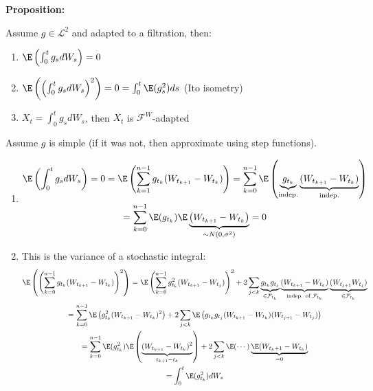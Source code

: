 \noindent\textbf{Proposition:}\par
\noindent Assume $g\in\mathcal{L}^2$ and adapted to a filtration, then:\par
\begin{enumerate}[leftmargin=*]
  \item $\E\left(\int_{0}^{t}g_sdW_s\right) = 0$
  \item $\E\left(\left(\int_{0}^{t}g_sdW_s\right)^2\right) = 0 = \int_{0}^{t}\E(g_s^2)ds$ (Ito isometry)
  \item $X_t = \int_{0}^{t}g_sdW_s$, then $X_t$ is $\mathcal{F}^W$-adapted
\end{enumerate}
\par\bigskip
\begin{prf}[]{}
  Assume $g$ is simple (if it was not, then approximate using step functions).
  \par\bigskip
  \begin{enumerate}[leftmargin=*]
    \item
      \begin{equation*}
        \begin{gathered}
          \E\left(\int_{0}^{t}g_sdW_s\right) = 0 = \E\left(\sum_{k=1}^{n-1}g_{t_k}(W_{t_{k+1}}-W_{t_k})\right) = \sum_{k=0}^{n-1}\E\left(\underbrace{g_{t_k}}_{\text{indep.}}\underbrace{(W_{t_{k+1}}-W_{t_k})}_{\text{indep.}}\right)\\
          = \sum_{k=0}^{n-1}\E(g_{t_k})\E\underbrace{\left(W_{t_{k+1}}-W_{t_k}\right)}_{\sim N(0,\sigma^2)} = 0
        \end{gathered}
      \end{equation*}
      \par\bigskip
    \item This is the variance of a stochastic integral:
      \begin{equation*}
        \begin{gathered}
          \E\left(\left(\sum_{k=0}^{n-1}g_{t_k}(W_{t_{k+1}}-W_{t_k})\right)^2\right) = \E\left(\sum_{k=0}^{n-1}g_{t_k}^2(W_{t_{k+1}}-W_{t_j})\right)^2 + 2\sum_{j<k}\underbrace{g_{t_k}g_{t_j}}_{\in\mathcal{F}_{t_k}}\underbrace{(W_{t_{k+1}}-W_{t_k})}_{\text{indep. of } \mathcal{F}_{t_k}}\underbrace{(W_{t_{j+1}}W_{t_j})}_{\in\mathcal{F}_{t_k}}\\
          = \sum_{k=0}^{n-1}\E\left(g_{t_k}^2(W_{t_{k+1}}-W_{t_k})^2\right)+2\sum_{j<k}\E\left(g_{t_k}g_{t_j}(W_{t_{k+1}}-W_{t_k})(W_{t_{j+1}}-W_{t_j})\right)\\
          = \sum_{k=0}^{n-1}\E(g_{t_k}^2)\E\left(\underbrace{(W_{t_{k+1}}-W_{t_k})^2}_{t_{k+1}-t_k}\right) + 2\sum_{j<k}\E(\cdots)\underbrace{\E(W_{t_k+1}-W_{t_k})}_{=0}\\
          = \int_{0}^{t}\E(g_{t_k}^2)dW_s
        \end{gathered}
      \end{equation*}
  \end{enumerate}
\end{prf}
\par\bigskip
